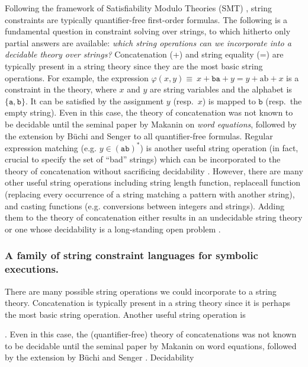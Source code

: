 Following the framework of Satisfiability Modulo Theories (SMT)
\cite{SMT-CACM,SMT-chapter,KS08}, string constraints are typically 
quantifier-free first-order formulas. The following is a fundamental question
in constraint solving over strings, to which hitherto only partial answers are 
available: \emph{which string operations can we
incorporate into a decidable theory over strings?}
Concatenation (+) and string equality (=) are typically present in a string 
theory since they are the most basic string operations. For example, the
expression $\varphi(x,y) \equiv\ x + \texttt{ba} + y = y + 
\text{ab} 
+ x$ is a constraint in the 
theory, where $x$ and $y$ are string variables and the alphabet is
$\{\texttt{a},\texttt{b}\}$.
It can be satisfied by the assignment $y$ (resp.~$x$) is mapped to $\texttt{b}$
(resp.~the empty string). Even in this case, the theory of concatenation was 
not known to be decidable until the seminal
paper by Makanin \cite{Makanin} on \emph{word equations}, followed by the
extension by B\"{u}chi and Senger \cite{buchi} to all quantifier-free formulas.
Regular expression matching (e.g. $y \in (\texttt{ab})^*$) is another useful
string operation (in fact, crucial to specify the set of ``bad'' strings) which
can be incorporated to the theory of concatenation without sacrificing
decidability \cite{Schulz}. 
However, there are many other useful string 
operations including string length function, replaceall
function (replacing every occurrence of a string matching a pattern with another
string), and casting functions (e.g. conversions
between integers and strings). Adding them to the theory of concatenation
either results in an undecidable string theory \cite{LB16,BFL13,GB16}
or one whose decidability is a long-standing open problem \cite{Vijay-length}.

\subsubsection*{A family of string constraint languages for symbolic executions.}
There are many possible string operations we could incorporate to a string 
theory.
Concatenation is typically present in a string theory since it is perhaps
the most basic string operation. Another useful string operation is 

. Even in this case, the (quantifier-free)
theory of concatenations was not known to be decidable until the seminal
paper by Makanin \cite{Makanin} on word equations, followed by the
extension by B\"{u}chi and Senger \cite{buchi}. Decidability 



